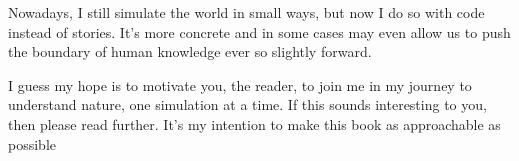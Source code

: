 Nowadays, I still simulate the world in small ways, but now I do so with code instead of stories. 
It's more concrete and in some cases may even allow us to push the boundary of human knowledge ever so slightly forward.

I guess my hope is to motivate you, the reader, to join me in my journey to understand nature, one simulation at a time.
If this sounds interesting to you, then please read further. 
It's my intention to make this book as approachable as possible
